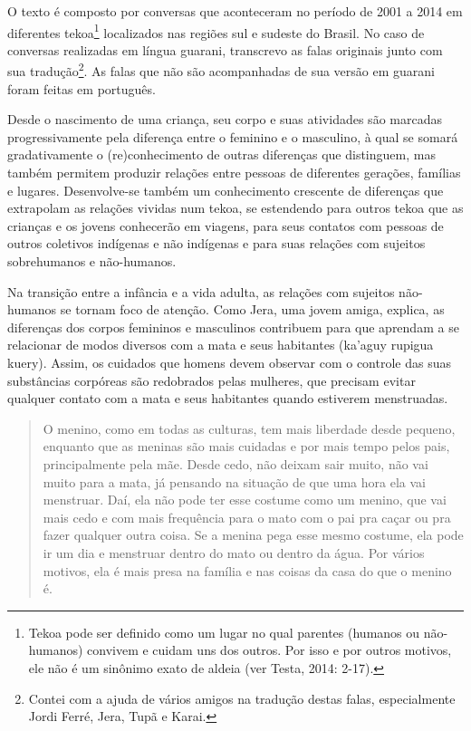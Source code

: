 O texto é composto por conversas que aconteceram no período de 2001 a
2014 em diferentes tekoa\footnote{Tekoa pode ser definido como um lugar
no qual parentes (humanos ou não-humanos) convivem e cuidam uns dos
outros. Por isso e por outros motivos, ele não é um sinônimo exato de
aldeia (ver Testa, 2014: 2-17).} localizados nas regiões sul e
sudeste do Brasil. No caso de conversas realizadas em língua guarani,
transcrevo as falas originais junto com sua tradução\footnote{Contei
com a ajuda de vários amigos na tradução destas falas, especialmente
Jordi Ferré, Jera, Tupã e Karai.}. As falas que não são acompanhadas
de sua versão em guarani foram feitas em português.

Desde o nascimento de uma criança, seu corpo e suas atividades são
marcadas progressivamente pela diferença entre o feminino e o
masculino, à qual se somará gradativamente o (re)conhecimento de outras
diferenças que distinguem, mas também permitem produzir relações entre
pessoas de diferentes gerações, famílias e lugares. Desenvolve-se
também um conhecimento crescente de diferenças que extrapolam as
relações vividas num tekoa, se estendendo para outros tekoa que as
crianças e os jovens conhecerão em viagens, para seus contatos com
pessoas de outros coletivos indígenas e não indígenas e para suas
relações com sujeitos sobrehumanos e não-humanos. 

Na transição entre a infância e a vida adulta, as relações com sujeitos
não-humanos se tornam foco de atenção. Como Jera, uma jovem amiga,
explica, as diferenças dos corpos femininos e masculinos contribuem
para que aprendam a se relacionar de modos diversos com a mata e seus
habitantes (ka’aguy rupigua kuery). Assim, os cuidados que homens devem
observar com o controle das suas substâncias corpóreas são redobrados
pelas mulheres, que precisam evitar qualquer contato com a mata e seus
habitantes quando estiverem menstruadas. 

\begin{quotation}
O menino, como em todas as culturas, tem mais liberdade desde pequeno,
enquanto que as meninas são mais cuidadas e por mais tempo pelos pais,
principalmente pela mãe. Desde cedo, não deixam sair muito, não vai
muito para a mata, já pensando na situação de que uma hora ela vai
menstruar. Daí, ela não pode ter esse costume como um menino, que vai
mais cedo e com mais frequência para o mato com o pai pra caçar ou pra
fazer qualquer outra coisa. Se a menina pega esse mesmo costume, ela
pode ir um dia e menstruar dentro do mato ou dentro da água. Por vários
motivos, ela é mais presa na família e nas coisas da casa do que o
menino é.
\end{quotation}

